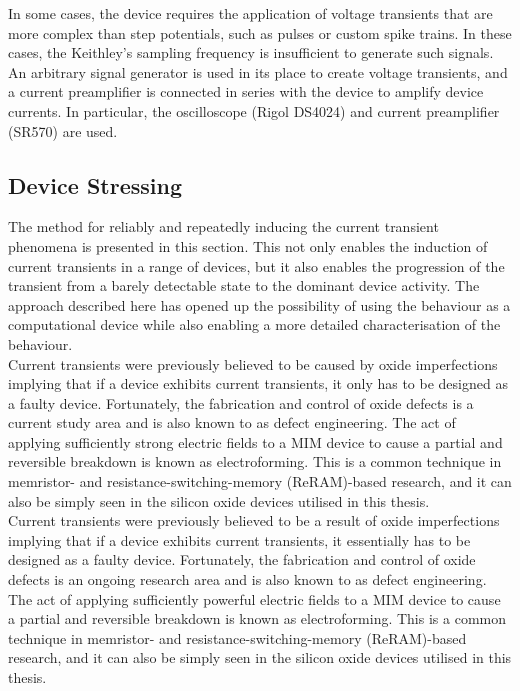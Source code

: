 \noindent In some cases, the device requires the application of voltage transients that are more complex than step potentials, such as pulses or custom spike trains. In these cases, the Keithley's sampling frequency is insufficient to generate such signals. An arbitrary signal generator is used in its place to create voltage transients, and a current preamplifier is connected in series with the device to amplify device currents. In particular, the oscilloscope (Rigol DS4024) and current preamplifier (SR570) are used.


\subsection[Device Stressing]{Device Stressing}

The method for reliably and repeatedly inducing the current transient phenomena is presented in this section. This not only enables the induction of current transients in a range of devices, but it also enables the progression of the transient from a barely detectable state to the dominant device activity. The approach described here has opened up the possibility of using the behaviour as a computational device while also enabling a more detailed characterisation of the behaviour. \\

\noindent Current transients were previously believed to be caused by oxide imperfections implying that if a device exhibits current transients, it only has to be designed as a faulty device. Fortunately, the fabrication and control of oxide defects is a current study area and is also known to as defect engineering. The act of applying sufficiently strong electric fields to a MIM device to cause a partial and reversible breakdown is known as electroforming. This is a common technique in memristor- and resistance-switching-memory (ReRAM)-based research, and it can also be simply seen in the silicon oxide devices utilised in this thesis.\\

\noindent Current transients were previously believed to be a result of oxide imperfections implying that if a device exhibits current transients, it essentially has to be designed as a faulty device. Fortunately, the fabrication and control of oxide defects is an ongoing research area and is also known to as defect engineering. The act of applying sufficiently powerful electric fields to a MIM device to cause a partial and reversible breakdown is known as electroforming. This is a common technique in memristor- and resistance-switching-memory (ReRAM)-based research, and it can also be simply seen in the silicon oxide devices utilised in this thesis.\\


